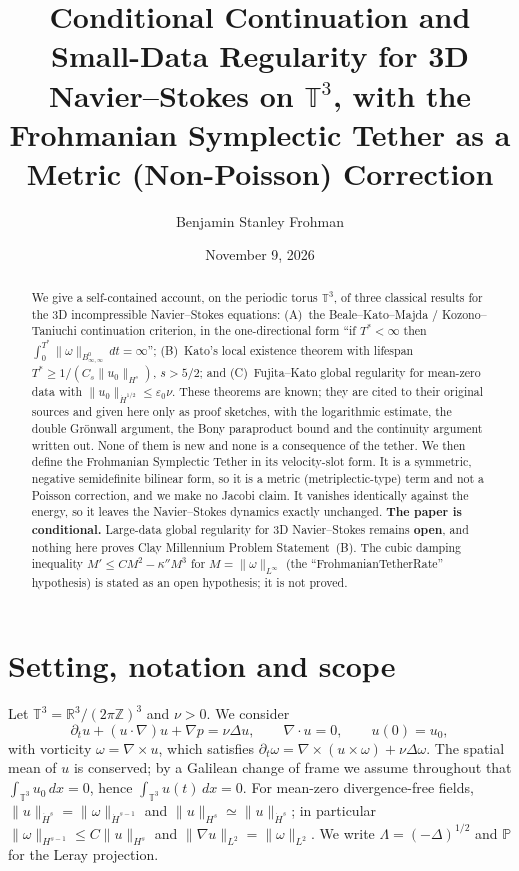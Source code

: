 \documentclass[11pt,reqno]{amsart}
\title[Conditional continuation, small data, and the tether on $\mathbb{T}^3$]{Conditional Continuation and Small-Data Regularity for 3D Navier--Stokes on $\mathbb{T}^3$, with the Frohmanian Symplectic Tether as a Metric (Non-Poisson) Correction}
\author{Benjamin Stanley Frohman}
\date{November 9, 2026}
\theoremstyle{definition}
\theoremstyle{remark}
\newcommand{\T}{\mathbb{T}^3}
\newcommand{\R}{\mathbb{R}}
\newcommand{\Z}{\mathbb{Z}}
\newcommand{\Bz}{B^0_{\infty,\infty}}
\newcommand{\dH}[1]{\dot H^{#1}}
\newcommand{\norm}[1]{\lVert #1\rVert}
\newcommand{\curl}{\nabla\times}
\begin{document}
\begin{abstract}
We give a self-contained account, on the periodic torus $\T$, of three classical results for the 3D incompressible Navier--Stokes equations:
(A)~the Beale--Kato--Majda / Kozono--Taniuchi continuation criterion, in the one-directional form ``if $T^*<\infty$ then $\int_0^{T^*}\norm{\omega}_{\Bz}\,dt=\infty$'';
(B)~Kato's local existence theorem with lifespan $T^*\ge 1/(C_s\norm{u_0}_{H^s})$, $s>5/2$; and
(C)~Fujita--Kato global regularity for mean-zero data with $\norm{u_0}_{\dH{1/2}}\le\varepsilon_0\nu$.
These theorems are known; they are cited to their original sources and given here only as proof sketches, with the logarithmic estimate, the double Gr\"onwall argument, the Bony paraproduct bound and the continuity argument written out. None of them is new and none is a consequence of the tether.
We then define the Frohmanian Symplectic Tether in its velocity-slot form. It is a symmetric, negative semidefinite bilinear form, so it is a metric (metriplectic-type) term and not a Poisson correction, and we make no Jacobi claim. It vanishes identically against the energy, so it leaves the Navier--Stokes dynamics exactly unchanged.
\textbf{The paper is conditional.} Large-data global regularity for 3D Navier--Stokes remains \textbf{open}, and nothing here proves Clay Millennium Problem Statement~(B). The cubic damping inequality $M'\le CM^2-\kappa''M^3$ for $M=\norm{\omega}_{L^\infty}$ (the ``FrohmanianTetherRate'' hypothesis) is stated as an open hypothesis; it is not proved.
\end{abstract}

\maketitle

\section{Setting, notation and scope}\label{sec:setting}

Let $\T=\R^3/(2\pi\Z)^3$ and $\nu>0$. We consider
\begin{equation}\label{eq:NS}
\partial_t u+(u\cdot\nabla)u+\nabla p=\nu\Delta u,\qquad \nabla\cdot u=0,\qquad u(0)=u_0,
\end{equation}
with vorticity $\omega=\curl u$, which satisfies $\partial_t\omega=\curl(u\times\omega)+\nu\Delta\omega$. The spatial mean of $u$ is conserved; by a Galilean change of frame we assume throughout that $\int_{\T}u_0\,dx=0$, hence $\int_{\T}u(t)\,dx=0$. For mean-zero divergence-free fields, $\norm{u}_{\dH{s}}=\norm{\omega}_{\dH{s-1}}$ and $\norm{u}_{H^s}\simeq\norm{u}_{\dH{s}}$; in particular $\norm{\omega}_{H^{s-1}}\le C\norm{u}_{H^s}$ and $\norm{\nabla u}_{L^2}=\norm{\omega}_{L^2}$. We write $\Lambda=(-\Delta)^{1/2}$ and $\mathbb P$ for the Leray projection.
\end{document}
